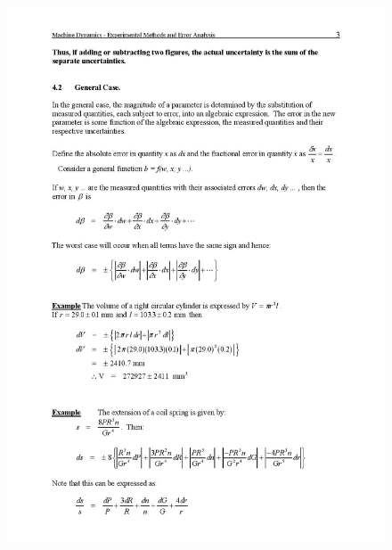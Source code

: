 \documentclass[12pt,a4paper]{report}
\begin{document}
\begin{figure}
  \includegraphics[width=\linewidth]{error/e3}
  \caption*{}
\label{}
\end{figure}
\end{document}
